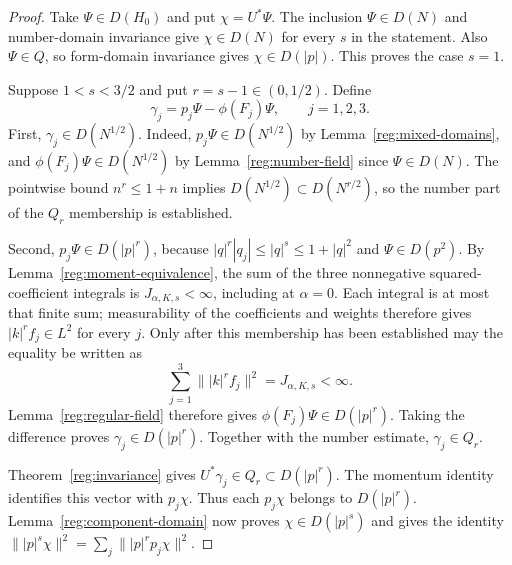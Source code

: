 \documentclass[11pt,a4paper]{article}
\theoremstyle{definition}
\theoremstyle{remark}
\begin{document}
\begin{proof}
Take \(\Psi\in D(H_0)\) and put \(\chi=U^*\Psi\).
The inclusion \(\Psi\in D(N)\) and number-domain invariance give
\(\chi\in D(N)\) for every \(s\) in the statement.
Also \(\Psi\in Q\), so form-domain invariance gives
\(\chi\in D(|p|)\). This proves the case \(s=1\).

Suppose \(1<s<3/2\) and put \(r=s-1\in(0,1/2)\). Define
\[
 \gamma_j=p_j\Psi-\phi(F_j)\Psi,\qquad j=1,2,3.
\]
First, \(\gamma_j\in D(N^{1/2})\). Indeed,
\(p_j\Psi\in D(N^{1/2})\) by Lemma~\ref{reg:mixed-domains}, and
\(\phi(F_j)\Psi\in D(N^{1/2})\) by
Lemma~\ref{reg:number-field} since \(\Psi\in D(N)\).
The pointwise bound \(n^r\leq1+n\) implies
\(D(N^{1/2})\subset D(N^{r/2})\), so the number part of the
\(Q_r\) membership is established.

Second, \(p_j\Psi\in D(|p|^r)\), because
\(|q|^r|q_j|\leq|q|^s\leq1+|q|^2\) and
\(\Psi\in D(p^2)\). By Lemma~\ref{reg:moment-equivalence},
the sum of the three nonnegative squared-coefficient integrals is
\(J_{\alpha,K,s}<\infty\), including at \(\alpha=0\).
Each integral is at most that finite sum; measurability of the
coefficients and weights therefore gives \(|k|^rf_j\in L^2\)
for every \(j\). Only after this membership has been established
may the equality be written as
\[
 \sum_{j=1}^3\||k|^rf_j\|^2=J_{\alpha,K,s}<\infty.
\]
Lemma~\ref{reg:regular-field} therefore gives
\(\phi(F_j)\Psi\in D(|p|^r)\). Taking the difference proves
\(\gamma_j\in D(|p|^r)\). Together with the number estimate,
\(\gamma_j\in Q_r\).

Theorem~\ref{reg:invariance} gives
\(U^*\gamma_j\in Q_r\subset D(|p|^r)\). The momentum identity
identifies this vector with \(p_j\chi\). Thus each
\(p_j\chi\) belongs to \(D(|p|^r)\).
Lemma~\ref{reg:component-domain} now proves
$\chi\in D(|p|^s)$ and gives the identity
$\||p|^s\chi\|^2=\sum_j\||p|^rp_j\chi\|^2$.


\end{proof}
\end{document}
